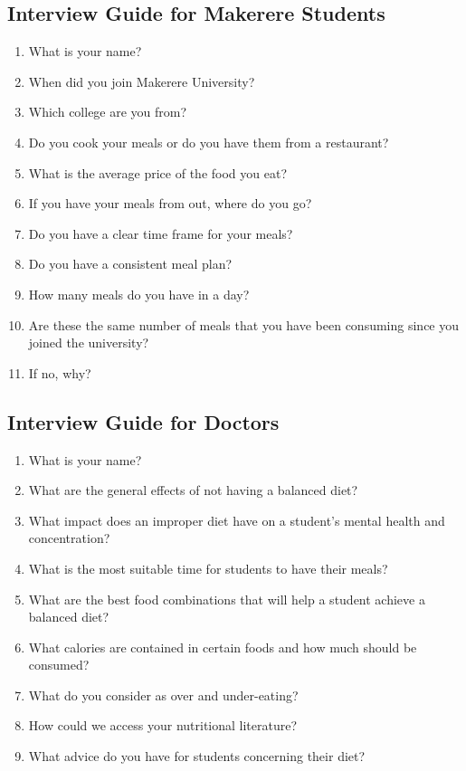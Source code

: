 \documentclass {article}
\begin{document}
\subsection{Interview Guide for Makerere Students}
\begin{enumerate}
\item What is your name?
\item When did you join Makerere University?
\item Which college are you from?
\item Do you cook your meals or do you have them from a restaurant?
\item What is the average price of the food you eat?
\item If you have your meals from out, where do you go?
\item Do you have a clear time frame for your meals?
\item Do you have a consistent meal plan?
\item How many meals do you have in a day?
\item Are these the same number of meals that you have been consuming since you joined the university?
\item If no, why?
\end{enumerate}

\subsection{Interview Guide for Doctors}
\begin{enumerate}
\item What is your name?
\item What are the general effects of not having a balanced diet?
\item What impact does an improper diet have on a student’s mental health and concentration?
\item What is the most suitable time for students to have their meals?
\item What are the best food combinations that will help a student achieve a balanced diet?
\item What calories are contained in certain foods and how much should be consumed?
\item What do you consider as over and under-eating?
\item How could we access your nutritional literature?
\item What advice do you have for students concerning their diet?
\end{enumerate}
\end{document}
